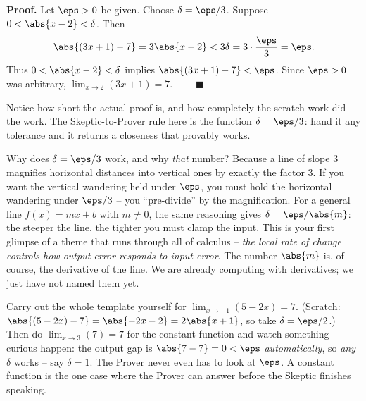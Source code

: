 \textbf{Proof.} Let $\eps > 0$ be given. Choose $\delta = \eps/3$. Suppose
$0 < \abs{x-2} < \delta$. Then
\[
  \abs{(3x+1) - 7} = 3\abs{x-2} < 3\delta = 3\cdot\frac{\eps}{3} = \eps.
\]
Thus $0<\abs{x-2}<\delta$ implies $\abs{(3x+1)-7}<\eps$. Since $\eps>0$ was
arbitrary, $\lim_{x\to 2}(3x+1) = 7$. $\qquad\blacksquare$

Notice how short the actual proof is, and how completely the scratch work did the
work. The Skeptic-to-Prover rule here is the function $\delta = \eps/3$: hand it
any tolerance and it returns a closeness that provably works.

\begin{whybox}
Why does $\delta = \eps/3$ work, and why \emph{that} number? Because a line of
slope $3$ magnifies horizontal distances into vertical ones by exactly the factor
$3$. If you want the vertical wandering held under $\eps$, you must hold the
horizontal wandering under $\eps/3$ -- you ``pre-divide'' by the magnification.
For a general line $f(x)=mx+b$ with $m\ne 0$, the same reasoning gives
$\delta = \eps/\abs{m}$: the steeper the line, the tighter you must clamp the
input. This is your first glimpse of a theme that runs through all of calculus --
\emph{the local rate of change controls how output error responds to input
error}. The number $\abs{m}$ is, of course, the derivative of the line. We are
already computing with derivatives; we just have not named them yet.
\end{whybox}

\begin{labbox}
Carry out the whole template yourself for $\displaystyle\lim_{x\to -1}(5 - 2x) =
7$. (Scratch: $\abs{(5-2x)-7} = \abs{-2x-2} = 2\abs{x+1}$, so take
$\delta = \eps/2$.) Then do $\lim_{x\to 3}(7) = 7$ for the constant function and
watch something curious happen: the output gap is $\abs{7-7}=0<\eps$
\emph{automatically}, so \emph{any} $\delta$ works -- say $\delta = 1$. The
Prover never even has to look at $\eps$. A constant function is the one case
where the Prover can answer before the Skeptic finishes speaking.
\end{labbox}

